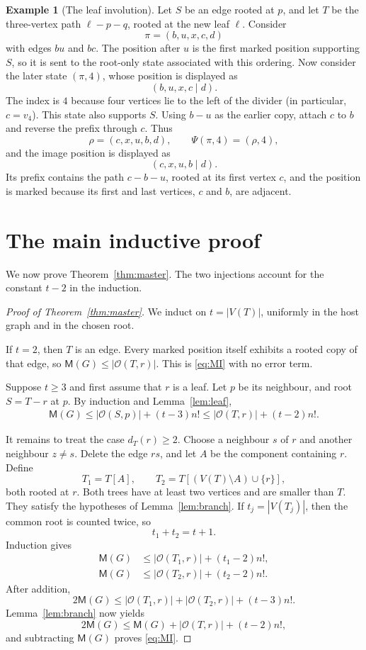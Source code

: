 \documentclass[11pt]{article}
\numberwithin{equation}{section}
\theoremstyle{definition}
\newtheorem{example}[theorem]{Example}
\newcommand{\cO}{\mathcal O}
\newcommand{\Mcnt}{\mathsf M}
\begin{document}
\begin{example}[The leaf involution]\label{ex:leaf}
Let $S$ be an edge rooted at $p$, and let $T$ be the three-vertex path
$\ell-p-q$, rooted at the new leaf $\ell$.  Consider
\[
        \pi=(b,u,x,c,d)
\]
with edges $bu$ and $bc$.  The position after $u$ is the first marked
position supporting $S$, so it is sent to the root-only state associated
with this ordering.  Now consider the later state
$(\pi,4)$, whose position is displayed as
\[
        (b,u,x,c\mid d).
\]
The index is $4$ because four vertices lie to the left of the divider (in
particular, $c=v_4$).  This state also supports $S$.  Using $b-u$ as the
earlier copy,
attach $c$ to $b$ and reverse the prefix through $c$.  Thus
\[
        \rho=(c,x,u,b,d),
        \qquad
        \Psi(\pi,4)=(\rho,4),
\]
and the image position is displayed as
\[
        (c,x,u,b\mid d).
\]
Its prefix contains the path $c-b-u$, rooted at its first vertex $c$, and
the position is marked because its first and last vertices, $c$ and $b$, are
adjacent.
\end{example}

\section{The main inductive proof}

We now prove Theorem~\ref{thm:master}.  The two injections account for the constant $t-2$ in the induction.

\begin{proof}[Proof of Theorem~\ref{thm:master}]
We induct on $t=|V(T)|$, uniformly in the host graph and in the chosen root.

If $t=2$, then $T$ is an edge.  Every marked position itself exhibits a rooted
copy of that edge, so $\Mcnt(G)\leq|\cO(T,r)|$.  This is \eqref{eq:MI} with
no error term.

Suppose $t\geq3$ and first assume that $r$ is a leaf.  Let $p$ be its
neighbour, and root $S=T-r$ at $p$.  By induction and Lemma~\ref{lem:leaf},
\[
\begin{aligned}
 \Mcnt(G)\leq |\cO(S,p)|+(t-3)n!\leq |\cO(T,r)|+(t-2)n!.
\end{aligned}
\]

It remains to treat the case $d_T(r)\geq2$.  Choose a neighbour $s$ of $r$
and another neighbour $z\neq s$.  Delete the edge $rs$, and let $A$ be the
component containing $r$.  Define
\[
        T_1=T[A],\qquad
        T_2=T[(V(T)\setminus A)\cup\{r\}],
\]
both rooted at $r$.  Both trees have at least two vertices and are smaller
than $T$.  They satisfy the hypotheses of Lemma~\ref{lem:branch}.  If
$t_j=|V(T_j)|$, then the common root is counted twice, so
\[
        t_1+t_2=t+1.
\]
Induction gives
\[
\begin{aligned}
 \Mcnt(G)&\leq |\cO(T_1,r)|+(t_1-2)n!,\\
 \Mcnt(G)&\leq |\cO(T_2,r)|+(t_2-2)n!.
\end{aligned}
\]
After addition,
\[
 2\Mcnt(G)\leq
 |\cO(T_1,r)|+|\cO(T_2,r)|+(t-3)n!.
\]
Lemma~\ref{lem:branch} now yields
\[
        2\Mcnt(G)\leq\Mcnt(G)+|\cO(T,r)|+(t-2)n!,
\]
and subtracting $\Mcnt(G)$ proves \eqref{eq:MI}.
\end{proof}
\end{document}
